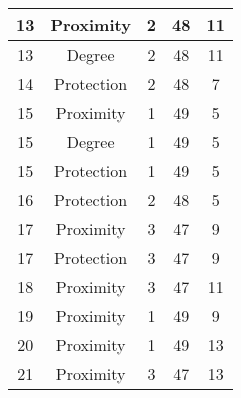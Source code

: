 \documentclass[results.tex]{subfiles}
\begin{document}
\begin{center}
\begin{tabular}{| c || c | c | c | c |}
            \hline
            13                      & Proximity                    & 2                      & 48                      & 11                   \\
            \hline
            13                      & Degree                       & 2                      & 48                      & 11                   \\
            \hline
            14                      & Protection                   & 2                      & 48                      & 7                    \\
            \hline
            15                      & Proximity                    & 1                      & 49                      & 5                    \\
            \hline
            15                      & Degree                       & 1                      & 49                      & 5                    \\
            \hline
            15                      & Protection                   & 1                      & 49                      & 5                    \\
            \hline
            16                      & Protection                   & 2                      & 48                      & 5                    \\
            \hline
            17                      & Proximity                    & 3                      & 47                      & 9                    \\
            \hline
            17                      & Protection                   & 3                      & 47                      & 9                    \\
            \hline
            18                      & Proximity                    & 3                      & 47                      & 11                   \\
            \hline
            19                      & Proximity                    & 1                      & 49                      & 9                    \\
            \hline
            20                      & Proximity                    & 1                      & 49                      & 13                   \\
            \hline
            21                      & Proximity                    & 3                      & 47                      & 13                   \\

\end{tabular}
\end{center}
\end{document}
